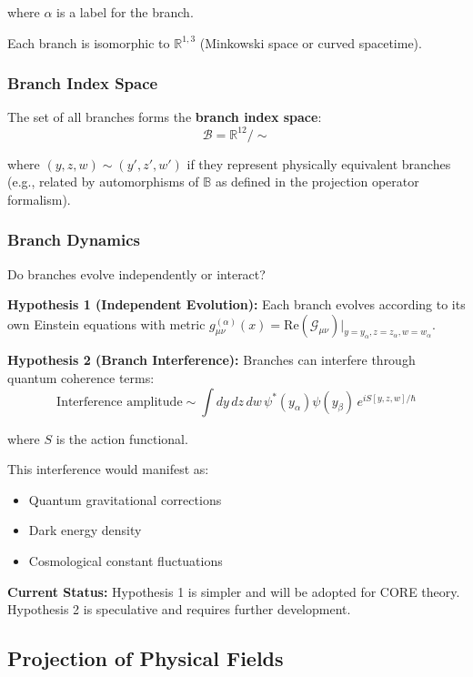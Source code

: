 where $\alpha$ is a label for the branch.

Each branch is isomorphic to $\mathbb{R}^{1,3}$ (Minkowski space or curved spacetime).

\subsubsection{Branch Index Space}

The set of all branches forms the \textbf{branch index space}:
\begin{equation}
\mathcal{B} = \mathbb{R}^{12} / \sim
\end{equation}

where $(y, z, w) \sim (y', z', w')$ if they represent physically equivalent branches (e.g., related by automorphisms of $\mathbb{B}$ as defined in the projection operator formalism).

\subsubsection{Branch Dynamics}

Do branches evolve independently or interact?

\textbf{Hypothesis 1 (Independent Evolution):} Each branch evolves according to its own Einstein equations with metric $g_{\mu\nu}^{(\alpha)}(x) = \text{Re}(\mathcal{G}_{\mu\nu})|_{y=y_{\alpha}, z=z_{\alpha}, w=w_{\alpha}}$.

\textbf{Hypothesis 2 (Branch Interference):} Branches can interfere through quantum coherence terms:
\begin{equation}
\text{Interference amplitude} \sim \int dy\,dz\,dw \, \psi^*(y_{\alpha}) \psi(y_{\beta}) \, e^{iS[y,z,w]/\hbar}
\end{equation}

where $S$ is the action functional.

This interference would manifest as:
\begin{itemize}
\item Quantum gravitational corrections
\item Dark energy density
\item Cosmological constant fluctuations
\end{itemize}

\textbf{Current Status:} Hypothesis 1 is simpler and will be adopted for CORE theory. Hypothesis 2 is speculative and requires further development.

\subsection{Projection of Physical Fields}

